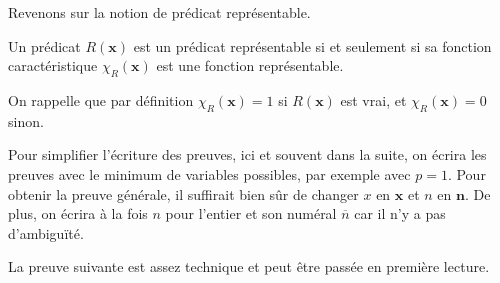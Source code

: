 \documentclass[11pt,class=report,crop=false]{standalone}
\begin{document}
Revenons sur la notion de prédicat représentable.

\begin{proposition}
    Un prédicat $R(\mathbf{x})$ est un prédicat représentable si et seulement si sa fonction caractéristique $\chi_R(\mathbf{x})$ est une fonction représentable.
\end{proposition}

On rappelle que par définition $\chi_R(\mathbf{x}) = 1$ si $R(\mathbf{x})$ est vrai, et $\chi_R(\mathbf{x}) = 0$ sinon.

Pour simplifier l'écriture des preuves, ici et souvent dans la suite, on écrira les preuves avec le minimum de variables possibles, par exemple avec $p=1$. Pour obtenir la preuve générale, il suffirait bien sûr de changer $x$ en $\mathbf{x}$ et $n$ en $\mathbf{n}$. De plus, on écrira à la fois $n$ pour l'entier et son numéral $\overline{n}$ car il n'y a pas d'ambiguïté.

La preuve suivante est assez technique et peut être passée en première lecture.
\end{document}
